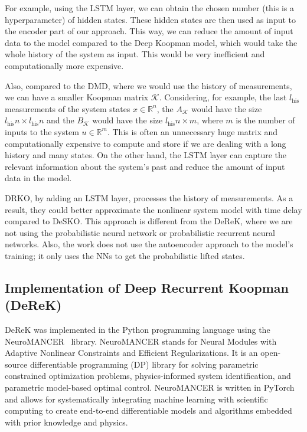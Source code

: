 \documentclass[conference]{IEEEtran}
\newcommand{\ui}[2]{#1_{\text{#2}}}
\begin{document}
For example, using the LSTM layer, we can obtain the chosen number (this is a hyperparameter) of hidden states. These hidden states are then used as input to the encoder part of our approach. This way, we can reduce the amount of input data to the model compared to the Deep Koopman model, which would take the whole history of the system as input. This would be very inefficient and computationally more expensive.

Also, compared to the DMD, where we would use the history of measurements, we can have a smaller Koopman matrix \(\mathcal{K}\). Considering, for example, the last \(\ui{l}{his}\) measurements of the system states \(x \in \mathbb{R}^n\), the \(A_\mathcal{K}\) would have the size \(\ui{l}{his}n \times \ui{l}{his}n\) and the \(B_\mathcal{K}\) would have the size \(\ui{l}{his}n \times m\),  where \(m\) is the number of inputs to the system \(u \in \mathbb{R}^m\). This is often an unnecessary huge matrix and computationally expensive to compute and store if we are dealing with a long history and many states. On the other hand, the LSTM layer can capture the relevant information about the system's past and reduce the amount of input data in the model.

DRKO, by adding an LSTM layer, processes the history of measurements. As a result, they could better approximate the nonlinear system model with time delay compared to DeSKO. This approach is different from the DeReK, where we are not using the probabilistic neural network or probabilistic recurrent neural networks. Also, the work does not use the autoencoder approach to the model's training; it only uses the NNs to get the probabilistic lifted states.

\subsection{Implementation of Deep Recurrent Koopman (DeReK)}
DeReK was implemented in the Python programming language using the NeuroMANCER~\cite{Neuromancer2023} library. NeuroMANCER stands for Neural Modules with Adaptive Nonlinear Constraints and Efficient Regularizations. It is an open-source differentiable programming (DP) library for solving parametric constrained optimization problems, physics-informed system identification, and parametric model-based optimal control. NeuroMANCER is written in PyTorch and allows for systematically integrating machine learning with scientific computing to create end-to-end differentiable models and algorithms embedded with prior knowledge and physics.
\end{document}
